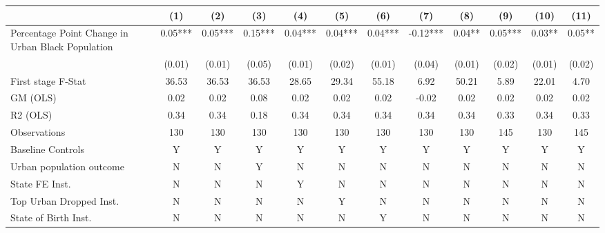  \begin{tabular}{l*{11}{c}} \toprule
                    &\multicolumn{1}{c}{(1)}   &\multicolumn{1}{c}{(2)}   &\multicolumn{1}{c}{(3)}   &\multicolumn{1}{c}{(4)}   &\multicolumn{1}{c}{(5)}   &\multicolumn{1}{c}{(6)}   &\multicolumn{1}{c}{(7)}   &\multicolumn{1}{c}{(8)}   &\multicolumn{1}{c}{(9)}   &\multicolumn{1}{c}{(10)}   &\multicolumn{1}{c}{(11)}   \\
\midrule
Percentage Point Change in Urban Black Population&     0.05***&     0.05***&     0.15***&     0.04***&     0.04***&     0.04***&    -0.12***&     0.04** &     0.05***&     0.03** &     0.05** \\
                    &   (0.01)   &   (0.01)   &   (0.05)   &   (0.01)   &   (0.02)   &   (0.01)   &   (0.04)   &   (0.01)   &   (0.02)   &   (0.01)   &   (0.02)   \\
\midrule
First stage F-Stat  &    36.53   &    36.53   &    36.53   &    28.65   &    29.34   &    55.18   &     6.92   &    50.21   &     5.89   &    22.01   &     4.70   \\
GM (OLS)            &     0.02   &     0.02   &     0.08   &     0.02   &     0.02   &     0.02   &    -0.02   &     0.02   &     0.02   &     0.02   &     0.02   \\
R2 (OLS)            &     0.34   &     0.34   &     0.18   &     0.34   &     0.34   &     0.34   &     0.34   &     0.34   &     0.33   &     0.34   &     0.33   \\
Observations        &      130   &      130   &      130   &      130   &      130   &      130   &      130   &      130   &      145   &      130   &      145   \\
Baseline Controls   &        Y   &        Y   &        Y   &        Y   &        Y   &        Y   &        Y   &        Y   &        Y   &        Y   &        Y   \\
Urban population outcome&        N   &        N   &        Y   &        N   &        N   &        N   &        N   &        N   &        N   &        N   &        N   \\
State FE Inst.      &        N   &        N   &        N   &        Y   &        N   &        N   &        N   &        N   &        N   &        N   &        N   \\
Top Urban Dropped Inst.&        N   &        N   &        N   &        N   &        Y   &        N   &        N   &        N   &        N   &        N   &        N   \\
State of Birth Inst.&        N   &        N   &        N   &        N   &        N   &        Y   &        N   &        N   &        N   &        N   &        N   \\

\end{tabular}
